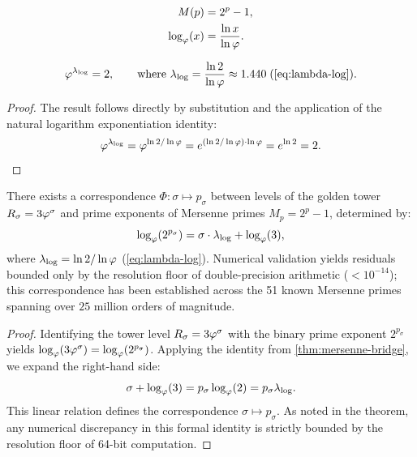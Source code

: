 \begin{Definition}\label{def:mersenne}
\begin{align}
  M(p) &= 2^p - 1,
    \label{eq:mersenne-def}  \\
  \log_\varphi(x) &= \frac{\ln x}{\ln\varphi}.
    \label{eq:log-phi}
\end{align}
\end{Definition}

\begin{Theorem}\label{thm:mersenne-bridge}
\begin{equation}\label{eq:mersenne-bridge}
  \golden^{\lambda_{\log}} = 2,
  \qquad\text{where } \lambda_{\log} = \frac{\ln 2}{\ln\golden}
  \approx 1.440
  \;\text{(\cref{eq:lambda-log})}.
\end{equation}
\end{Theorem}

\begin{proof}
The result follows directly by substitution and the application of the natural logarithm exponentiation identity:
\[
  \varphi^{\lambda_{\log}}
  = \varphi^{\ln 2/\ln\varphi}
  = e^{(\ln 2/\ln\varphi)\cdot\ln\varphi}
  = e^{\ln 2} = 2.
\]
\end{proof}

\begin{Theorem}\label{thm:log-correspondence}
There exists a correspondence $\Phi\colon\sigma\mapsto p_\sigma$ between
levels of the golden tower $R_\sigma = 3\varphi^\sigma$ and prime exponents
of Mersenne primes $M_p = 2^p - 1$, determined by:
\begin{equation}\label{eq:log-correspondence}
  \log_\varphi(2^{p_\sigma})
    = \sigma\cdot\lambda_{\log} + \log_\varphi(3),
\end{equation}
where $\lambda_{\log} = \ln 2/\ln\varphi$
(\cref{eq:lambda-log}). Numerical validation yields residuals bounded only by the resolution floor of
double-precision arithmetic ($< 10^{-14}$); this correspondence has been
established across the 51 known Mersenne primes spanning over $25$ million
orders of magnitude.
\end{Theorem}

\begin{proof}
Identifying the tower level $R_\sigma = 3\varphi^\sigma$ with the binary prime exponent $2^{p_\sigma}$ yields $\log_\varphi(3\varphi^\sigma) = \log_\varphi(2^{p_\sigma})$. Applying the identity from \cref{thm:mersenne-bridge}, we expand the right-hand side:
\[
  \sigma + \log_\varphi(3) = p_\sigma \log_\varphi(2) = p_\sigma \lambda_{\log}.
\]
This linear relation defines the correspondence $\sigma\mapsto p_\sigma$. As noted in the theorem, any numerical discrepancy in this formal identity is strictly bounded by the resolution floor of 64-bit computation.
\end{proof}

